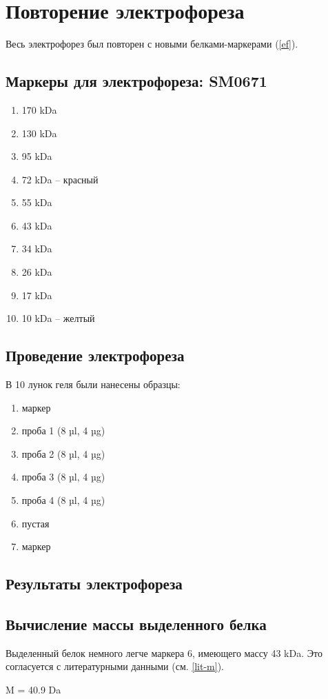 \section{Повторение электрофореза}

Весь электрофорез был повторен с новыми белками-маркерами (\ref{ef}).

\subsection{Маркеры для электрофореза: SM0671}
\begin{enumerate}
\item 170 kDa
\item 130 kDa
\item 95 kDa
\item 72 kDa -- красный
\item 55 kDa
\item 43 kDa
\item 34 kDa
\item 26 kDa
\item 17 kDa
\item 10 kDa -- желтый
\end{enumerate}

\subsection{Проведение электрофореза}
В 10 лунок геля были нанесены образцы:
\begin{enumerate}
\item маркер
\item проба 1 (8 µl, 4 µg)
\item проба 2 (8 µl, 4 µg)
\item проба 3 (8 µl, 4 µg)
\item проба 4 (8 µl, 4 µg)
\item пустая
\item маркер
\end{enumerate}


\subsection{Результаты электрофореза}
\def\svgwidth{0.7\linewidth}

\subsection{Вычисление массы выделенного белка}
Выделенный белок немного легче маркера 6, имеющего массу 43 kDa.
Это согласуется с литературными данными (см. \ref{lit-m}).



M = 40.9 Da


